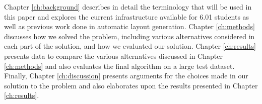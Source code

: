 Chapter \ref{ch:background} describes in detail the terminology that will be
used in this paper and explores the current infrastructure available for
6.01 students as well as previous work done in automatic layout generation.
Chapter \ref{ch:methods} discusses how we solved the problem, including various
alternatives considered in each part of the solution, and how we evaluated
our solution. Chapter \ref{ch:results} presents data to compare the various
alternatives discussed in Chapter \ref{ch:methods} and also evaluates the final
algorithm on a large test dataset. Finally, Chapter \ref{ch:discussion}
presents arguments for the choices made in our solution to the problem and
also elaborates upon the results presented in Chapter \ref{ch:results}.

%

